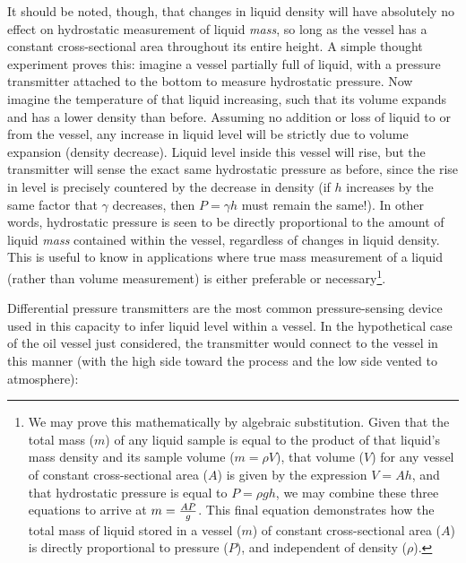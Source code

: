 It should be noted, though, that changes in liquid density will have absolutely no effect on hydrostatic measurement of liquid \textit{mass}, so long as the vessel has a constant cross-sectional area throughout its entire height.  A simple thought experiment proves this: imagine a vessel partially full of liquid, with a pressure transmitter attached to the bottom to measure hydrostatic pressure.  Now imagine the temperature of that liquid increasing, such that its volume expands and has a lower density than before.  Assuming no addition or loss of liquid to or from the vessel, any increase in liquid level will be strictly due to volume expansion (density decrease).  Liquid level inside this vessel will rise, but the transmitter will sense the exact same hydrostatic pressure as before, since the rise in level is precisely countered by the decrease in density (if $h$ increases by the same factor that $\gamma$ decreases, then $P = \gamma h$ must remain the same!).  In other words, hydrostatic pressure is seen to be directly proportional to the amount of liquid \textit{mass} contained within the vessel, regardless of changes in liquid density.  This is useful to know in applications where true mass measurement of a liquid (rather than volume measurement) is either preferable or necessary\footnote{We may prove this mathematically by algebraic substitution.  Given that the total mass ($m$) of any liquid sample is equal to the product of that liquid's mass density and its sample volume ($m = \rho V$), that volume ($V$) for any vessel of constant cross-sectional area ($A$) is given by the expression $V = Ah$, and that hydrostatic pressure is equal to $P = \rho g h$, we may combine these three equations to arrive at $m = {AP \over g}$.  This final equation demonstrates how the total mass of liquid stored in a vessel ($m$) of constant cross-sectional area ($A$) is directly proportional to pressure ($P$), and independent of density ($\rho$).}.    

\vskip 10pt

Differential pressure transmitters are the most common pressure-sensing device used in this capacity to infer liquid level within a vessel.  In the hypothetical case of the oil vessel just considered, the transmitter would connect to the vessel in this manner (with the high side toward the process and the low side vented to atmosphere):

